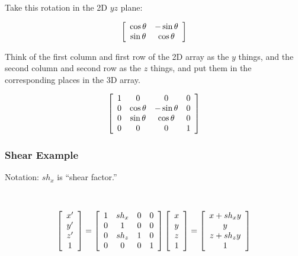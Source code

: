 Take this rotation in the 2D $yz$ plane:

$$
\left[ 
	\begin{array}{cccc}
		\cos \theta & -\sin \theta\cr
		\sin \theta & \cos \theta  \cr
	\end{array}
\right]
$$

Think of the first column and first row of the 2D array as the $y$ things, and the second column and second row as the $z$ things, and put them in the corresponding places in the 3D array.  

$$
\left[ 
	\begin{array}{cccc}
		1 & 0 & 0 & 0 \cr
		0 & \cos \theta & -\sin \theta & 0 \cr
		0 & \sin \theta & \cos \theta & 0 \cr
		0 & 0 & 0 & 1 \cr
	\end{array}
\right]
$$

\subsubsection{Shear Example}

Notation:  $sh_x$ is ``shear factor.''

\

$$
\left[
	\begin{array}{cccc}
		x' \cr y' \cr z' \cr 1 \cr
	\end{array}
\right]
=
\left[
	\begin{array}{cccc}
		1 & sh_x & 0 & 0 \cr
		0 & 1 & 0 & 0 \cr
		0 & sh_z & 1 & 0 \cr
		0 & 0 & 0 & 1 \cr
	\end{array}
\right]
\left[
	\begin{array}{cccc}
		x \cr y \cr z \cr 1 \cr
	\end{array}
\right]
=
\left[
	\begin{array}{cccc}
		x + sh_x  y\cr
		y \cr
		z + sh_z y  \cr
		1 \cr
	\end{array}
\right]
$$

\


